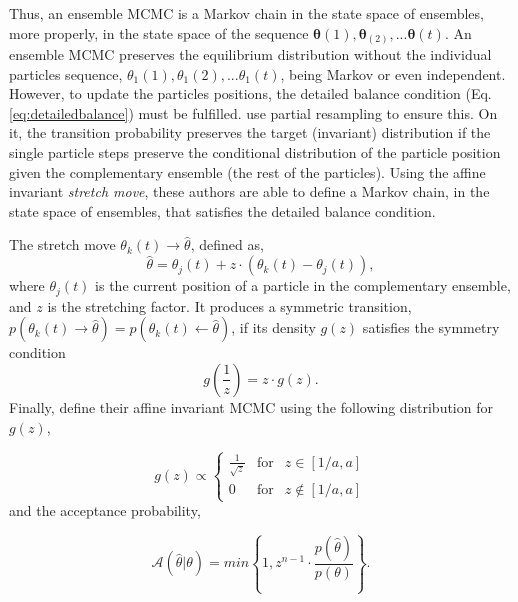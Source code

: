 Thus, an ensemble MCMC is a Markov chain in the state space of ensembles, more properly, in the state space of the sequence $\boldsymbol{\theta}(1),\boldsymbol{\theta}_(2),...\boldsymbol{\theta}(t)$. An ensemble MCMC preserves the equilibrium distribution without the individual particles sequence, $\theta_1(1),\theta_1(2),...\theta_1(t)$, being Markov or even independent. However, to update the particles positions, the detailed balance condition (Eq. \ref{eq:detailedbalance}) must be fulfilled. \citet{Goodman2010} use partial resampling to ensure this. On it, the transition probability preserves the target (invariant) distribution if the single particle steps preserve the conditional distribution of the particle position given the complementary ensemble (the rest of the particles). Using the affine invariant \emph{stretch move}, these authors are able to define a Markov chain, in the state space of ensembles, that satisfies the detailed balance condition. 

The stretch move $\theta_k(t) \rightarrow \hat{\theta}$, defined as,
\begin{equation}
\label{eq:stretchmove}
\hat{\theta}= \theta_j(t) + z\cdot(\theta_k(t)-\theta_j(t)),\nonumber 
\end{equation}
where $\theta_j(t)$ is the current position of a particle in the complementary ensemble, and $z$ is the stretching factor. It produces a symmetric transition, $p(\theta_k(t) \rightarrow \hat{\theta})=p(\theta_k(t) \leftarrow \hat{\theta})$, if its density $g(z)$ satisfies the symmetry condition
\begin{equation}
g(\frac{1}{z})= z\cdot g(z).\nonumber 
\end{equation}
Finally, \citet{Goodman2010} define their affine invariant MCMC using the following distribution for $g(z)$,

\begin{equation}
g(z) \propto \left\{ \begin{array}{rcl}
         \frac{1}{\sqrt{z}} & \mbox{for}&  z\in[1/a,a] \\ 
         0  & \mbox{for} &  z\notin[1/a,a]
                \end{array}\right.
\label{eq:gz}
\end{equation} 
and the acceptance probability,

\begin{equation}
\mathcal{A}(\hat{\theta}|\theta)=min\left\{1,z^{n-1}\cdot \frac{p(\hat{\theta})}{p(\theta)}\right\}.
\end{equation} 


